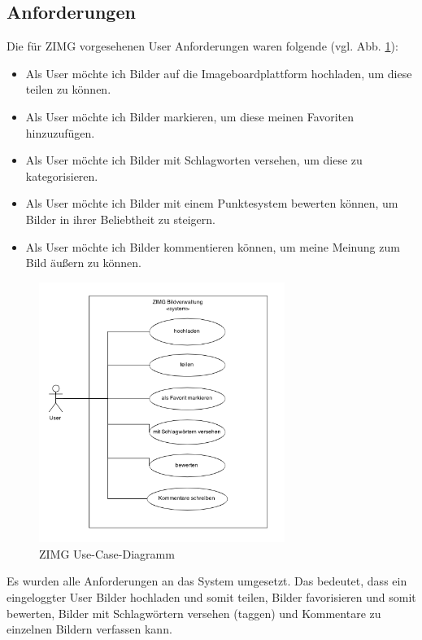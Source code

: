 \documentclass[12pt, oneside, a4paper]{article}		%
\begin{document}
\subsection{Anforderungen}

Die für ZIMG vorgesehenen User Anforderungen waren folgende (vgl. Abb. \ref{ZIMGUseCaseDiagram}):

\begin{itemize}
	\item Als User möchte ich Bilder auf die Imageboardplattform hochladen, um diese teilen zu können.
	\item Als User möchte ich Bilder markieren, um diese meinen Favoriten hinzuzufügen.
	\item Als User möchte ich Bilder mit Schlagworten versehen, um diese zu kategorisieren.
	\item Als User möchte ich Bilder mit einem Punktesystem bewerten können, um Bilder in ihrer Beliebtheit zu steigern.
	\item Als User möchte ich Bilder kommentieren können, um meine Meinung zum Bild äußern zu können.
\end{itemize}

\begin{figure}[H]
 	\centering
 	\includegraphics[width=8cm]{footage/ZIMG_UseCaseDiagram} 
 	\caption{ZIMG Use-Case-Diagramm}
	\label{ZIMGUseCaseDiagram}
 \end{figure}

 Es wurden alle Anforderungen an das System umgesetzt. Das bedeutet, dass ein eingeloggter User Bilder hochladen und somit teilen, Bilder favorisieren und somit bewerten, Bilder mit Schlagwörtern versehen (taggen) und Kommentare zu einzelnen Bildern verfassen kann.
\end{document}
